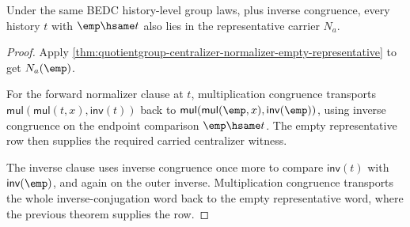 \begin{theorem}
\label{thm:quotientgroup-centralizer-normalizer-empty-representative-transport}
Under the same BEDC history-level group laws, plus inverse congruence, every
history $t$ with $\emp\hsame t$ also lies in the representative carrier $N_a$.
\end{theorem}
\begin{proof}
Apply
\autoref{thm:quotientgroup-centralizer-normalizer-empty-representative} to get
$N_a(\emp)$.

For the forward normalizer clause at $t$, multiplication congruence transports
$\mathsf{mul}(\mathsf{mul}(t,x),\mathsf{inv}(t))$ back to
$\mathsf{mul}(\mathsf{mul}(\emp,x),\mathsf{inv}(\emp))$, using inverse
congruence on the endpoint comparison $\emp\hsame t$. The empty representative
row then supplies the required carried centralizer witness.

The inverse clause uses inverse congruence once more to compare
$\mathsf{inv}(t)$ with $\mathsf{inv}(\emp)$, and again on the outer inverse.
Multiplication congruence transports the whole inverse-conjugation word back to
the empty representative word, where the previous theorem supplies the row.
\end{proof}


